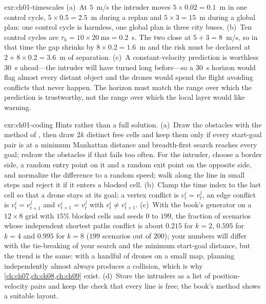 \begin{solution}{exr:ch01-timescales}
(a)~At $5$~m/s the intruder moves $5\times0.02 = 0.1$~m in one control cycle,
$5\times0.5 = 2.5$~m during a replan and $5\times3 = 15$~m during a global plan: one
control cycle is harmless, one global plan is three city buses.
(b)~Ten control cycles are $\tau_h = 10\times20\ \mathrm{ms} = 0.2$~s.
The two close at $5+3 = 8$~m/s, so in that time the gap shrinks by
$8\times0.2 = 1.6$~m and the risk must be declared at
$2 + 8\times0.2 = 3.6$~m of separation.
(c)~A constant-velocity prediction is worthless $30$~s ahead---the intruder will have
turned long before---so a $30$~s horizon would flag almost every distant object and
the drones would spend the flight avoiding conflicts that never happen. The horizon
must match the range over which the prediction is trustworthy, not the range over
which the local layer would like warning.
\end{solution}

\begin{solution}{exr:ch01-coding}
Hints rather than a full solution. (a)~Draw the obstacles with the
 method of , then draw $2k$ distinct free cells and keep them
only if every start-goal pair is at a minimum Manhattan distance and breadth-first
search reaches every goal; redraw the obstacles if that fails too often. For the
intruder, choose a border side, a random entry point on it and a random exit point on
the opposite side, and normalize the difference to a random speed; walk along the
line in small steps and reject it if it enters a blocked cell. (b)~Clamp the time
index to the last cell so that a drone stays at its goal; a vertex conflict is
$v_t^i=v_t^j$, an edge conflict is $v_t^i=v_{t+1}^j$ and $v_{t+1}^i=v_t^j$ with
$v_t^i\ne v_{t+1}^i$. (c)~With the book's generator on a $12\times 8$ grid with $15\%$
blocked cells and seeds $0$ to $199$, the fraction of scenarios whose independent
shortest paths conflict is about $0.215$ for $k=2$, $0.595$ for $k=4$ and $0.995$
for $k=8$ ($199$ scenarios out of $200$); your numbers will differ with the tie-breaking of your search and the minimum
start-goal distance, but the trend is the same: with a handful of drones on a small
map, planning independently almost always produces a collision, which is why
\cref{ch:ch07,ch:ch08,ch:ch09} exist. (d)~Store the intruders as a list of
position-velocity pairs and keep the check that every line is free; the book's
 method shows a suitable layout.
\end{solution}
